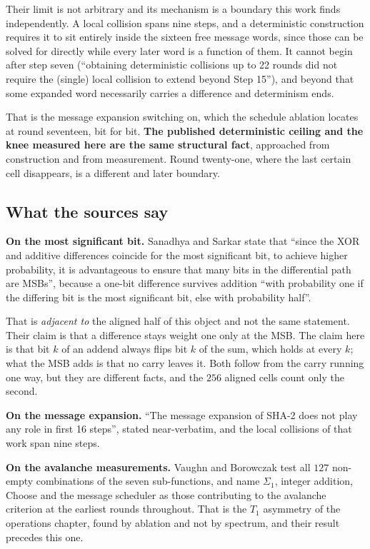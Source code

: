 Their limit is not arbitrary and its mechanism is a boundary this work finds independently. A local
collision spans nine steps, and a deterministic construction requires it to sit entirely inside the
sixteen free message words, since those can be solved for directly while every later word is a
function of them. It cannot begin after step seven (``obtaining deterministic collisions up to
22 rounds did not require the (single) local collision to extend beyond Step 15''), and beyond
that some expanded word necessarily carries a difference and determinism ends.

That is the message expansion switching on, which the schedule ablation locates at round seventeen,
bit for bit. \textbf{The published deterministic ceiling and the knee measured here are the same
structural fact}, approached from construction and from measurement. Round twenty-one, where the
last certain cell disappears, is a different and later boundary.

\subsection{What the sources say}

\textbf{On the most significant bit.} Sanadhya and Sarkar state that ``since the XOR and additive
differences coincide for the most significant bit, to achieve higher probability, it is advantageous
to ensure that many bits in the differential path are MSBs'', because a one-bit difference survives
addition ``with probability one if the differing bit is the most significant bit, else with
probability half''.

That is \emph{adjacent to} the aligned half of this object and not the same statement. Their claim
is that a difference stays weight one only at the MSB. The claim here is that bit \(k\) of an addend
always flips bit \(k\) of the sum, which holds at every \(k\); what the MSB adds is that no carry
leaves it. Both follow from the carry running one way, but they are different facts, and the \(256\)
aligned cells count only the second.

\textbf{On the message expansion.} ``The message expansion of SHA-2 does not play any role in first
16 steps'', stated near-verbatim, and the local collisions of that work span nine steps.

\textbf{On the avalanche measurements.} Vaughn and Borowczak test all \(127\) non-empty combinations
of the seven sub-functions, and name \(\Sigma_1\), integer addition, Choose and the message scheduler
as those contributing to the avalanche criterion at the earliest rounds throughout. That is the
\(T_1\) asymmetry of the operations chapter, found by ablation and not by spectrum, and their result
precedes this one.

